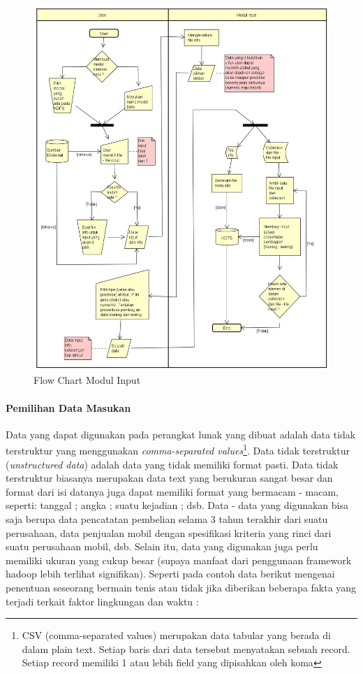 \begin{figure}[H]
	\centering
	\label{fig:flow_input}
	\includegraphics[scale=0.55]{Diagram/Flowchart_Input}
	\caption[Flow Chart Modul Input]{Flow Chart Modul Input}
	\label{fig:Flow Chart Modul Input}
\end{figure}

\paragraph{Pemilihan Data Masukan}
Data yang dapat digunakan pada perangkat lunak yang dibuat adalah data tidak terstruktur yang menggunakan \textit{comma-separated values}\footnote{ CSV (comma-separated values) merupakan data tabular yang berada di dalam plain text. Setiap baris dari data tersebut menyatakan sebuah record. Setiap record memiliki 1 atau lebih field yang dipisahkan oleh koma}. Data tidak terstruktur (\textit{unstructured data}) adalah data yang tidak memiliki format pasti. Data tidak terstruktur biasanya merupakan data text yang berukuran sangat besar dan format dari isi datanya juga dapat memiliki format yang bermacam - macam, seperti: tanggal ; angka ; suatu kejadian ; dsb. 
Data - data yang digunakan bisa saja berupa data pencatatan pembelian selama 3 tahun terakhir dari suatu perusahaan, data penjualan mobil dengan spesifikasi kriteria yang rinci dari suatu perusahaan mobil, dsb. Selain itu, data yang digunakan juga perlu memiliki ukuran yang cukup besar (supaya manfaat dari penggunaan framework hadoop lebih terlihat signifikan). Seperti pada contoh data berikut mengenai penentuan seseorang bermain tenis atau tidak jika diberikan beberapa fakta yang terjadi terkait faktor lingkungan dan waktu :

